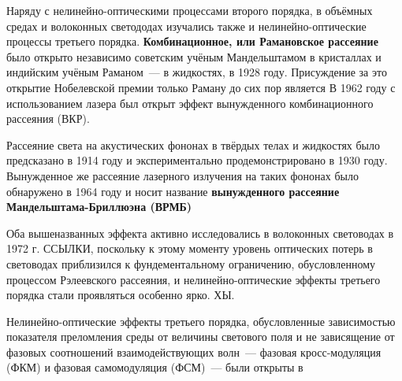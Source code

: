 Наряду с нелинейно-оптическими процессами второго порядка, в объёмных средах и волоконных светододах изучались также и нелинейно-оптические процессы третьего порядка. \textbf{Комбинационное, или Рамановское рассеяние} было открыто независимо советским учёным Мандельштамом в кристаллах и индийским учёным Раманом~--- в жидкостях, в 1928 году. Присуждение за это открытие Нобелевской премии  только Раману до сих пор является  В 1962 году с использованием  лазера был открыт эффект вынужденного комбинационного рассеяния (ВКР).

Рассеяние света на акустических фононах в твёрдых телах и жидкостях было предсказано в 1914 году и экспериментально продемонстрировано в 1930 году. Вынужденное же рассеяние лазерного излучения на таких фононах было обнаружено в 1964 году и носит название \textbf{вынужденного рассеяние Мандельштама-Бриллюэна (ВРМБ)}

Оба вышеназванных эффекта активно исследовались в волоконных световодах в 1972 г. ССЫЛКИ, поскольку к этому моменту уровень оптических потерь в световодах приблизился к фундементальному ограничению, обусловленному процессом Рэлеевского рассеяния, и нелинейно-оптические эффекты третьего порядка стали проявляться особенно ярко. ХЫ.

Нелинейно-оптические эффекты третьего порядка, обусловленные зависимостью показателя преломления среды от величины светового поля и не зависящение от фазовых соотношений взаимодействующих волн~--- фазовая кросс-модуляция (ФКМ) и фазовая самомодуляция (ФСМ)~--- были открыты в 

 
